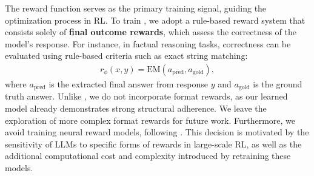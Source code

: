The reward function serves as the primary training signal, guiding the optimization process in RL. To train \Ours, we adopt a rule-based reward system that consists solely of \textbf{final outcome rewards}, which assess the correctness of the model’s response. For instance, in factual reasoning tasks, correctness can be evaluated using rule-based criteria such as exact string matching:
\begin{gather}
    r_{\phi}(x, y) = \text{EM}(a_\text{pred}, a_\text{gold}),
\end{gather}
where $a_\text{pred}$ is the extracted final answer from response $y$ and $a_\text{gold}$ is the ground truth answer.
Unlike \cite{guo2025deepseek}, we do not incorporate format rewards, as our learned model already demonstrates strong structural adherence. We leave the exploration of more complex format rewards for future work. Furthermore, we avoid training neural reward models, following \cite{guo2025deepseek}. This decision is motivated by the sensitivity of LLMs to specific forms of rewards in large-scale RL, as well as the additional computational cost and complexity introduced by retraining these models.
